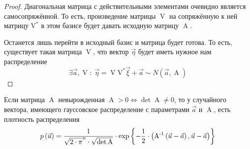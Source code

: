 \begin{proof}
    Диагональная матрица с действительными элементами очевидно является
    самосопряжённой. То есть, произведение матрицы $\operatorname{V}$ на
    сопряжённую к ней матрицу $\operatorname{V^*}$ в этом базисе будет давать
    исходную матрицу $\operatorname{A}$.

    Останется лишь перейти в исходный базис и матрица будет готова. То есть,
    существует такая матрица $\operatorname{V}$, что вектор $\vec{\eta}$ будет
    иметь нужное нам распределение
    $$\exists \vec{a}, \operatorname{V}:\;
        \vec{\eta} = \operatorname{V} \operatorname{V^*} \vec{\xi} + \vec{a}
        \sim N\left( \vec{a}, \operatorname{A} \right)$$
\end{proof}

\begin{theorem}
    \label{theorem:gaussianVector:dencity}
    Если матрица $\operatorname{A}$ невырожденная
    $\operatorname{A} > 0 \Leftrightarrow \det{\operatorname{A}} \neq 0$,
    то у случайного вектора, имеющего гауссовское распределение с параметрами
    $\vec{a}$ и $\operatorname{A}$, есть плотность распределения
    $$p\left(\vec{u}\right)
        = \frac{1}{\sqrt{2 \cdot \pi}^n \cdot \sqrt{\det{\operatorname{A}}}}
            \cdot \exp{\left\{ -\frac{1}{2} \cdot \left(
                \operatorname{A^{-1}} \left( \vec{u} - \vec{a} \right),
                \vec{u} - \vec{a} \right) \right\}}$$
\end{theorem}

